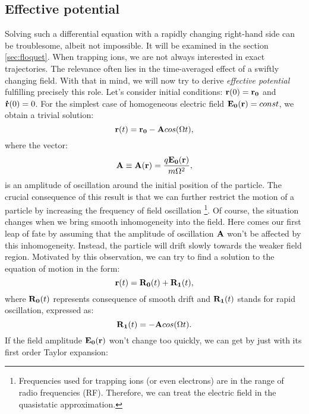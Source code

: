 	\subsection{Effective potential}
Solving such a differential equation with a rapidly changing right-hand side can be troublesome, albeit not impossible. It will be examined in the section \ref{sec:floquet}. When trapping ions, we are not always interested in exact trajectories. The relevance often lies in the time-averaged effect of a swiftly changing field. With that in mind, we will now try to derive \emph{effective potential} fulfilling precisely this role.
Let's consider initial conditions: $\vb{r}(0) = \vb{r_0}$ and $\vb{\dot{r}}(0) = 0$. For the simplest case of homogeneous electric field $\vb{E_0}(\vb{r}) = const$, we obtain a trivial solution:
\begin{equation}
	\label{solution for homogenious field}
	\vb{r}(t) = \vb{r_0} - \vb{A} cos(\Omega t),
\end{equation}
where the vector: 
\begin{equation}
	\label{oscillation amplitude}
	\vb{A} \equiv \vb{A}(\vb{r}) = \frac{q \vb{E_0}(\vb{r})}{m \Omega^2},
\end{equation}
is an amplitude of oscillation around the initial position of the particle. The crucial consequence of this result is that we can further restrict the motion of a particle by increasing the frequency of field oscillation \footnote{Frequencies used for trapping ions (or even electrons) are in the range of radio frequencies (RF). Therefore, we can treat the electric field in the quasistatic approximation.}. Of course, the situation changes when we bring smooth inhomogeneity into the field. Here comes our first leap of fate by assuming that the amplitude of oscillation $\vb{A}$ won't be affected by this inhomogeneity. Instead, the particle will drift slowly towards the weaker field region. Motivated by this observation, we can try to find a solution to the equation of motion in the form:
\begin{equation}
	\label{motion separation}
	\vb{r}(t) = \vb{R_0}(t) + \vb{R_1}(t),
\end{equation}
where $\vb{R_0}(t)$ represents consequence of smooth drift and $\vb{R_1}(t)$ stands for rapid oscillation, expressed as:
\begin{equation}
	\label{oscillation motion}
	\vb{R_1}(t) = - \vb{A} cos(\Omega t).
\end{equation}
If the field amplitude $\vb{E_0}(\vb{r})$ won't change too quickly, we can get by just with its first order Taylor expansion:

